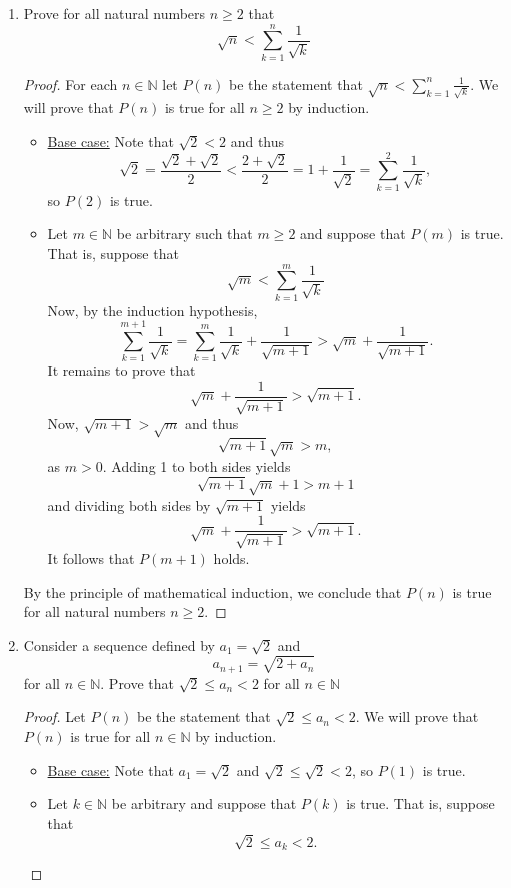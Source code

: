 \documentclass[11pt]{article}
\def\naturals{\mathbb{N}}
\begin{document}
\begin{enumerate}
\item Prove for all natural numbers $n\geq2$ that 
\[
 \sqrt{n} < \sum_{k=1}^n \frac{1}{\sqrt{k}}
\]
\begin{Solution}
 \begin{proof}
  For each $n\in\naturals$ let $P(n)$ be the statement that $\sqrt{n} < \sum_{k=1}^n \frac{1}{\sqrt{k}}$. We will prove that $P(n)$ is true for all $n\geq 2$ by induction.
  \begin{itemize}
   \item \underline{Base case:} Note that $\sqrt{2}<2$ and thus 
   \[
    \sqrt{2}  = \frac{\sqrt{2} + \sqrt{2}}{2} <\frac{2 + \sqrt{2}}{2}  = 1 + \frac{1}{\sqrt{2}} = \sum_{k=1}^2 \frac{1}{\sqrt{k}}, 
   \]
so $P(2)$ is true.
\item \underline{} Let $m\in\naturals$ be arbitrary such that $m\geq2$ and suppose that $P(m)$ is true. That is, suppose that 
\[
 \sqrt{m} < \sum_{k=1}^m \frac{1}{\sqrt{k}} \tag{IH}
\]
Now, by the induction hypothesis,
\[
 \sum_{k=1}^{m+1} \frac{1}{\sqrt{k}} = \sum_{k=1}^{m} \frac{1}{\sqrt{k}} + \frac{1}{\sqrt{m+1}}  > \sqrt{m} + \frac{1}{\sqrt{m+1}}.
\]
It remains to prove that 
\[
 \sqrt{m} + \frac{1}{\sqrt{m+1}} > \sqrt{m+1}.
\]
Now, $\sqrt{m+1}>\sqrt{m}$ and thus
\[
 \sqrt{m+1}\sqrt{m} > m,
\]
as $m>0$. Adding 1 to both sides yields 
\[
 \sqrt{m+1}\sqrt{m} +1 > m + 1
\]
and dividing both sides by $\sqrt{m+1}$ yields
\[
 \sqrt{m} +\frac{1}{\sqrt{m+1}} > \sqrt{m + 1}.
\]
It follows that $P(m+1)$ holds.
  \end{itemize}
By the principle of mathematical induction, we conclude that $P(n)$ is true for all natural numbers  $n\geq 2$. 
 \end{proof}

\end{Solution}


\item Consider a sequence defined by $a_1 = \sqrt{2}$ and 
\[
 a_{n+1} = \sqrt{2+a_n}
\]
for all $n\in\naturals$. Prove that $\sqrt{2}\leq a_n< 2$ for all $n\in\naturals$


\begin{Solution}
  \begin{proof}
  Let $P(n)$ be the statement that $\sqrt{2}\leq a_n< 2$. We will prove that $P(n)$ is true for all $n\in\naturals$ by induction.
  \begin{itemize}
   \item \underline{Base case:} Note that $a_1=\sqrt{2}$ and $\sqrt{2} \leq \sqrt{2} < 2$, so $P(1)$ is true.
\item \underline{} Let $k\in\naturals$ be arbitrary and suppose that $P(k)$ is true. That is, suppose that
\[
 \sqrt{2}\leq a_k< 2. \tag{IH}
\]


\end{itemize}
\end{proof}
\end{Solution}
\end{enumerate}
\end{document}
